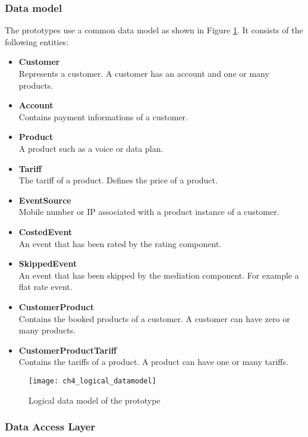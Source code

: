 \subsubsection{Data model}
The prototypes use a common data model as shown in Figure \ref{fig:ch4_data_model}. It consists of the following entities:

\begin{itemize}
	\item \textbf{Customer}\\
	Represents a customer. A customer has an account and one or many products.
	\item \textbf{Account}\\
	Contains payment informations of a customer.
	\item \textbf{Product}\\
	A product such as a voice or data plan.
	\item \textbf{Tariff}\\
	The tariff of a product. Defines the price of a product.
	\item \textbf{EventSource}\\
	Mobile number or IP associated with a product instance of a customer.
	\item \textbf{CostedEvent}\\
	An event that has been rated by the rating component.
	\item \textbf{SkippedEvent}\\
	An event that has been skipped by the mediation component. For example a flat rate event.
	\item \textbf{CustomerProduct}\\
	Contains the booked products of a customer. A customer can have zero or many products.
	\item \textbf{CustomerProductTariff}\\
	Contains the tariffs of a product. A product can have one or many tariffs.
\end{itemize}

\begin{figure}[htbp]
	\centering
	\texttt{[image: ch4\_logical\_datamodel]}
	\caption{Logical data model of the prototype}
	\label{fig:ch4_data_model}
\end{figure}

\subsubsection{Data Access Layer}

